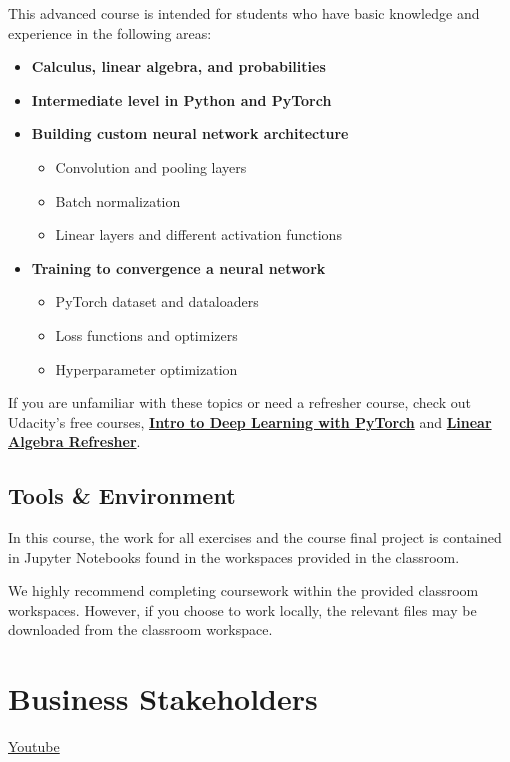 This advanced course is intended for students who have basic knowledge and experience in the following areas:

\begin{itemize}
    \item \textbf{Calculus, linear algebra, and probabilities}
    \item \textbf{Intermediate level in Python and PyTorch}
    \item \textbf{Building custom neural network architecture}
    \begin{itemize}
        \item Convolution and pooling layers
        \item Batch normalization
        \item Linear layers and different activation functions
    \end{itemize}
    \item \textbf{Training to convergence a neural network}
    \begin{itemize}
        \item PyTorch dataset and dataloaders
        \item Loss functions and optimizers
        \item Hyperparameter optimization
    \end{itemize}
\end{itemize}
If you are unfamiliar with these topics or need a refresher course, check out Udacity's free courses, \href{https://www.udacity.com/course/deep-learning-pytorch--ud188}{\textbf{Intro to Deep Learning with PyTorch}} and \href{https://www.udacity.com/course/linear-algebra-refresher-course--ud953}{\textbf{Linear Algebra Refresher}}.

\subsection{Tools \& Environment}
In this course, the work for all exercises and the course final project is contained in Jupyter Notebooks found in the workspaces provided in the classroom. \newline

We highly recommend completing coursework within the provided classroom workspaces. However, if you choose to work locally, the relevant files may be downloaded from the classroom workspace.

\section{Business Stakeholders}
\href{https://www.youtube.com/watch?v=eN_X5kgG9V4&t=19s}{Youtube} \newline

